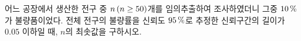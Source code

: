 어느 공장에서 생산한 전구 중 $n\mkern3mu (n\ge 50)$개를 임의추출하여 조사하였더니 그중 $10\mkern3mu \%$가 불량품이었다. 전체 전구의 불량률을 신뢰도 $95\mkern3mu \%$로 추정한 신뢰구간의 길이가 $0.05$ 이하일 때, $n$의 최솟값을 구하시오. 
